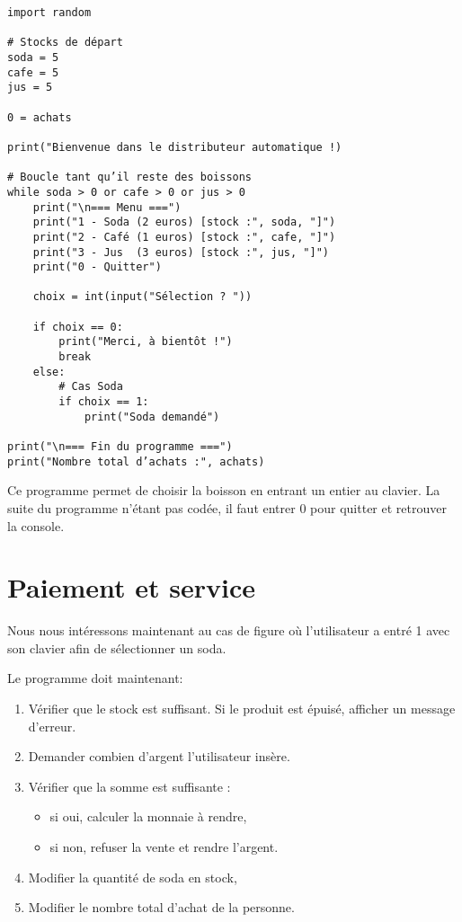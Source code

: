 \begin{verbatim}
import random

# Stocks de départ
soda = 5
cafe = 5
jus = 5

0 = achats

print("Bienvenue dans le distributeur automatique !)

# Boucle tant qu’il reste des boissons
while soda > 0 or cafe > 0 or jus > 0
    print("\n=== Menu ===")
    print("1 - Soda (2 euros) [stock :", soda, "]")
    print("2 - Café (1 euros) [stock :", cafe, "]")
    print("3 - Jus  (3 euros) [stock :", jus, "]")
    print("0 - Quitter")

    choix = int(input("Sélection ? "))

    if choix == 0:
        print("Merci, à bientôt !")
        break
    else:
        # Cas Soda
        if choix == 1:
            print("Soda demandé")

print("\n=== Fin du programme ===")
print("Nombre total d’achats :", achats)
\end{verbatim}

Ce programme permet de choisir la boisson en entrant un entier au clavier. La suite du programme n'étant pas codée, il faut entrer 0 pour quitter et retrouver la console.


\section{Paiement et service}

Nous nous intéressons maintenant au cas de figure où l'utilisateur a entré 1 avec son clavier afin de sélectionner un soda.

Le programme doit maintenant:
\begin{enumerate}
    \item Vérifier que le stock est suffisant. Si le produit est épuisé, afficher un message d’erreur.
    \item Demander combien d’argent l’utilisateur insère.
    \item Vérifier que la somme est suffisante :
    \begin{itemize}
        \item si oui, calculer la monnaie à rendre,
        \item si non, refuser la vente et rendre l’argent.
    \end{itemize}
    \item Modifier la quantité de soda en stock,
    \item Modifier le nombre total d'achat de la personne.
\end{enumerate}

